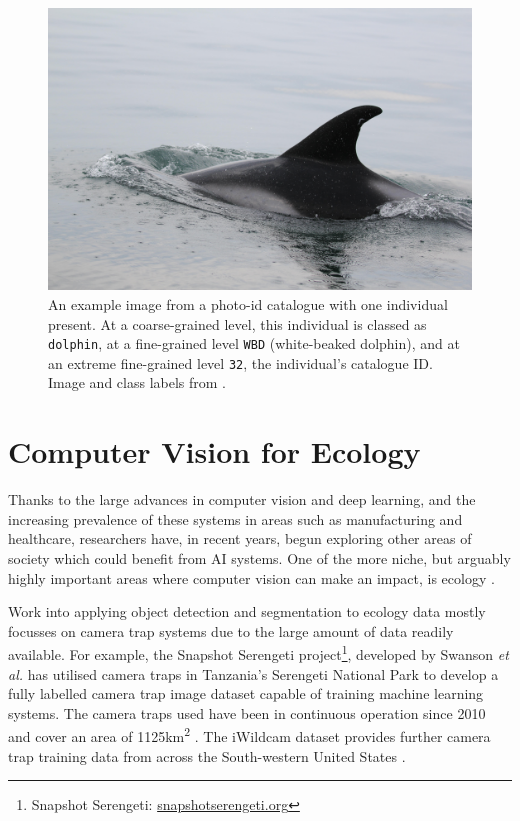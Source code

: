 \begin{figure}
	\begin{center}
		\includegraphics[scale=0.05]{Chapter2/figs/2192.jpg}
	\end{center}
	\caption[An example image from a photo-id catalogue with one individual present.]{An example image from a photo-id catalogue with one individual present. At a coarse-grained level, this individual is classed as \texttt{dolphin}, at a fine-grained level \texttt{WBD} (white-beaked dolphin), and at an extreme fine-grained level \texttt{32}, the individual's catalogue ID. Image and class labels from \cite{trotter_ndd20_2020}.}
	\label{fig:granularity-differences}
\end{figure}

\section{Computer Vision for Ecology}\label{ch:Background,sec:conTech}

Thanks to the large advances in computer vision and deep learning, and the increasing prevalence of these systems in areas such as manufacturing and healthcare, researchers have, in recent years, begun exploring other areas of society which could benefit from AI systems. One of the more niche, but arguably highly important areas where computer vision can make an impact, is ecology \cite{weinstein_computer_2018}.

Work into applying object detection and segmentation to ecology data mostly focusses on camera trap systems due to the large amount of data readily available. For example, the Snapshot Serengeti project\footnote{Snapshot Serengeti: \href{https://www.snapshotserengeti.org/}{snapshotserengeti.org}}, developed by Swanson \textit{et al.} has utilised camera traps in Tanzania's Serengeti National Park to develop a fully labelled camera trap image dataset capable of training machine learning systems. The camera traps used have been in continuous operation since 2010 and cover an area of 1125km\textsuperscript{2} \cite{swanson_snapshot_2015}. The iWildcam dataset provides further camera trap training data from across the South-western United States \cite{beery_iwildcam_2019}.

